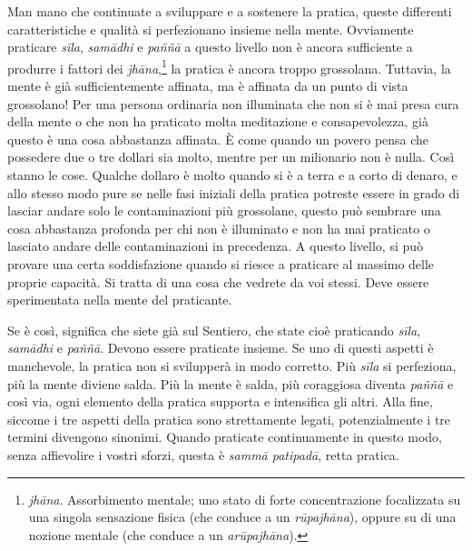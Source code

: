 Man mano che continuate a sviluppare e a sostenere la pratica, queste
differenti caratteristiche e qualità si perfezionano insieme nella
mente. Ovviamente praticare \emph{sīla}, \emph{samādhi} e \emph{paññā} a
questo livello non è ancora sufficiente a produrre i fattori dei
\emph{jhāna},\footnote{\emph{jhāna}. Assorbimento mentale; uno stato di
  forte concentrazione focalizzata su una singola sensazione fisica (che
  conduce a un \emph{rūpajhāna}), oppure su di una nozione mentale (che
  conduce a un \emph{arūpajhāna}).} la pratica è ancora troppo
grossolana. Tuttavia, la mente è già sufficientemente affinata, ma è
affinata da un punto di vista grossolano! Per una persona ordinaria non
illuminata che non si è mai presa cura della mente o che non ha
praticato molta meditazione e consapevolezza, già questo è una cosa
abbastanza affinata. È come quando un povero pensa che possedere due o
tre dollari sia molto, mentre per un milionario non è nulla. Così stanno
le cose. Qualche dollaro è molto quando si è a terra e a corto di
denaro, e allo stesso modo pure se nelle fasi iniziali della pratica
potreste essere in grado di lasciar andare solo le contaminazioni più
grossolane, questo può sembrare una cosa abbastanza profonda per chi non
è illuminato e non ha mai praticato o lasciato andare delle
contaminazioni in precedenza. A questo livello, si può provare una certa
soddisfazione quando si riesce a praticare al massimo delle proprie
capacità. Si tratta di una cosa che vedrete da voi stessi. Deve essere
sperimentata nella mente del praticante.

Se è così, significa che siete già sul Sentiero, che state cioè
praticando \emph{sīla}, \emph{samādhi} e \emph{paññā}. Devono essere
praticate insieme. Se uno di questi aspetti è manchevole, la pratica non
si svilupperà in modo corretto. Più \emph{sīla} si perfeziona, più la
mente diviene salda. Più la mente è salda, più coraggiosa diventa
\emph{paññā} e così via, ogni elemento della pratica supporta e
intensifica gli altri. Alla fine, siccome i tre aspetti della pratica
sono strettamente legati, potenzialmente i tre termini divengono
sinonimi. Quando praticate continuamente in questo modo, senza
affievolire i vostri sforzi, questa è \emph{sammā patipadā}, retta
pratica.

